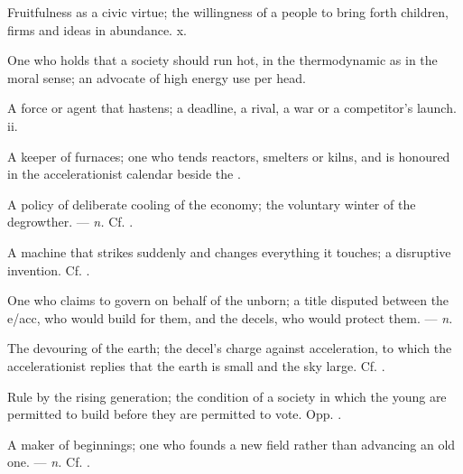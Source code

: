  Fruitfulness as a civic virtue; the willingness of a people to bring forth children, firms and ideas in abundance.   x.

 One who holds that a society should run hot, in the thermodynamic as in the moral sense; an advocate of high energy use per head.

 A force or agent that hastens; a deadline, a rival, a war or a competitor's launch.   ii.

 A keeper of furnaces; one who tends reactors, smelters or kilns, and is honoured in the accelerationist calendar beside the .

  A policy of deliberate cooling of the economy; the voluntary winter of the degrowther.   ---  \textit{n.} Cf. .

 A machine that strikes suddenly and changes everything it touches; a disruptive invention. Cf. .

 One who claims to govern on behalf of the unborn; a title disputed between the e/acc, who would build for them, and the decels, who would protect them. ---  \textit{n.}

  The devouring of the earth; the decel's charge against acceleration, to which the accelerationist replies that the earth is small and the sky large. Cf. .

 Rule by the rising generation; the condition of a society in which the young are permitted to build before they are permitted to vote. Opp. .

 A maker of beginnings; one who founds a new field rather than advancing an old one. ---  \textit{n.} Cf. .

